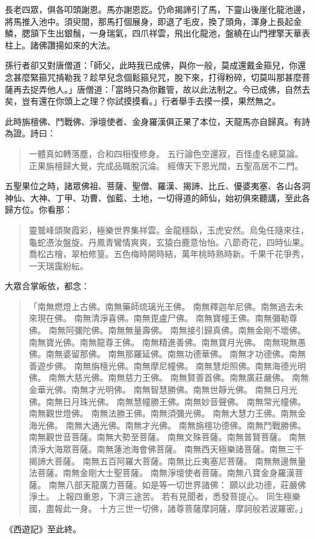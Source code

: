 長老四眾，俱各叩頭謝恩。馬亦謝恩訖。仍命揭諦引了馬，下靈山後崖化龍池邊，將馬推入池中。須臾間，那馬打個展身，即退了毛皮，換了頭角，渾身上長起金鱗，腮頷下生出銀鬚，一身瑞氣，四爪祥雲，飛出化龍池，盤繞在山門裡擎天華表柱上。諸佛讚揚如來的大法。

孫行者卻又對唐僧道：「師父，此時我已成佛，與你一般，莫成還戴金箍兒，你還念甚麼緊箍咒掯勒我？趁早兒念個鬆箍兒咒，脫下來，打得粉碎，切莫叫那甚麼菩薩再去捉弄他人。」唐僧道：「當時只為你難管，故以此法制之。今已成佛，自然去矣，豈有還在你頭上之理？你試摸摸看。」行者舉手去摸一摸，果然無之。

此時旃檀佛、鬥戰佛、淨壇使者、金身羅漢俱正果了本位，天龍馬亦自歸真。有詩為證。詩曰：
\begin{quote}
一體真如轉落塵，合和四相復修身。
五行論色空還寂，百怪虛名總莫論。
正果旃檀歸大覺，完成品職脫沉淪。
經傳天下恩光闊，五聖高居不二門。
\end{quote}

五聖果位之時，諸眾佛祖、菩薩、聖僧、羅漢、揭諦、比丘、優婆夷塞、各山各洞神仙、大神、丁甲、功曹、伽藍、土地，一切得道的師仙，始初俱來聽講，至此各歸方位。你看那：
\begin{quote}
靈鷲峰頭聚霞彩，極樂世界集祥雲。金龍穩臥，玉虎安然。烏兔任隨來往，龜蛇憑汝盤旋。丹鳳青鸞情爽爽，玄猿白鹿意怡怡。八節奇花，四時仙果。喬松古檜，翠柏修篁。五色梅時開時結，萬年桃時熟時新。千果千花爭秀，一天瑞靄紛紜。
\end{quote}

大眾合掌皈依，都念：
\begin{quote}
「南無燃燈上古佛。南無藥師琉璃光王佛。
南無釋迦牟尼佛。南無過去未來現在佛。
南無清淨喜佛。南無毘盧尸佛。
南無寶幢王佛。南無彌勒尊佛。
南無阿彌陀佛。南無無量壽佛。
南無接引歸真佛。南無金剛不壞佛。
南無寶光佛。南無龍尊王佛。
南無精進善佛。南無寶月光佛。
南無現無愚佛。南無婆留那佛。
南無那羅延佛。南無功德華佛。
南無才功德佛。南無善遊步佛。
南無旃檀光佛。南無摩尼幢佛。
南無慧炬照佛。南無海德光明佛。
南無大慈光佛。南無慈力王佛。
南無賢善首佛。南無廣莊嚴佛。
南無金華光佛。南無才光明佛。
南無智慧勝佛。南無世靜光佛。
南無日月光佛。南無日月珠光佛。
南無慧幢勝王佛。南無妙音聲佛。
南無常光幢佛。南無觀世燈佛。
南無法勝王佛。南無須彌光佛。
南無大慧力王佛。南無金海光佛。
南無大通光佛。南無才光佛。
南無旃檀功德佛。南無鬥戰勝佛。
南無觀世音菩薩。南無大勢至菩薩。
南無文殊菩薩。南無普賢菩薩。
南無清淨大海眾菩薩。南無蓮池海會佛菩薩。
南無西天極樂諸菩薩。南無三千揭諦大菩薩。
南無五百阿羅大菩薩。南無比丘夷塞尼菩薩。
南無無邊無量法菩薩。南無金剛大士聖菩薩。
南無淨壇使者菩薩。南無八寶金身羅漢菩薩。
南無八部天龍廣力菩薩。如是等一切世界諸佛：
願以此功德，莊嚴佛淨土。
上報四重恩，下濟三途苦。
若有見聞者，悉發菩提心。
同生極樂國，盡報此一身。
十方三世一切佛，諸尊菩薩摩訶薩，摩訶般若波羅密。」
\end{quote}

《西遊記》至此終。
